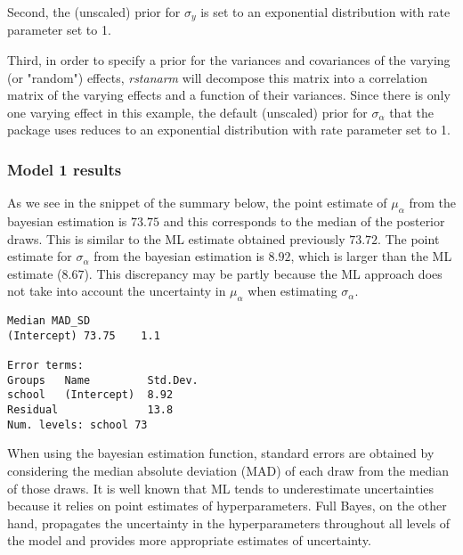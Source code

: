 Second, the (unscaled) prior for $\sigma_{y}$ is set to an exponential distribution with rate parameter set to 1.

Third, in order to specify a prior for the variances and covariances of the varying (or "random") effects, \textit{rstanarm} will decompose this matrix into a correlation matrix of the varying effects and a function of their variances.  Since there is only one varying effect in this example, the default (unscaled) prior for $\sigma_{\alpha}$ that the package uses reduces to an exponential distribution with rate parameter set to 1.

\subsubsection*{Model 1 results}  
As we see in the snippet of the summary below, the point estimate of $\mu_{\alpha}$ from the bayesian estimation is $73.75$ and this corresponds to the median of the posterior draws.  This is similar to the ML estimate obtained previously $73.72$.  The point estimate for $\sigma_{\alpha}$ from the bayesian estimation is $8.92$, which is larger than the ML estimate ($8.67$). This discrepancy may be partly because the ML approach does not take into account the uncertainty in $\mu_{\alpha}$ when estimating $\sigma_{\alpha}$.

\begin{Verbatim}[frame=single]
Median MAD_SD
(Intercept) 73.75    1.1  

Error terms:
Groups   Name         Std.Dev.
school   (Intercept)  8.92    
Residual              13.8    
Num. levels: school 73 
\end{Verbatim}

When using the bayesian estimation function, standard errors are obtained by considering the median absolute deviation (MAD) of each draw from the median of those draws.  It is well known that ML tends to underestimate uncertainties because it relies on point estimates of hyperparameters. Full Bayes, on the other hand, propagates the uncertainty in the hyperparameters throughout all levels of the model and provides more appropriate estimates of uncertainty.

